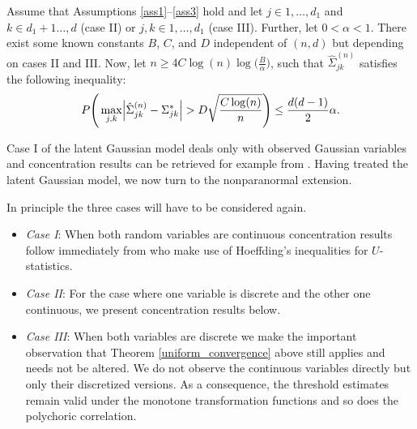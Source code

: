\begin{theorem}\label{uniform_convergence}
    Assume that Assumptions \ref{ass1}--\ref{ass3} hold and let $j \in 1, \dots, d_1$ and $k \in d_1+1 \dots, d$ (case II) or $j,k \in 1, \dots, d_1$ (case III). Further, let $0 < \alpha < 1$. There exist some known constants $B$, $C$, and $D$ independent of $(n,d)$ but depending on cases II and III. Now, let $n \geq 4 C \log(n) \log\Big(\frac{B}{\alpha}\Big)$, such that $\hat{\Sigma}_{jk}^{(n)}$ satisfies the following inequality:
    \begin{equation}
        P\Bigg(\max_{j,k}\abs{\hat{\Sigma}_{jk}^{(n)} - \Sigma_{jk}^{*}} > D\sqrt{\frac{C \log(n)}{n} }\Bigg) \leq \frac{d(d-1)}{2}\alpha.
    \end{equation}
\end{theorem}
\noindent Case I of the latent Gaussian model deals only with observed Gaussian variables and concentration results can be retrieved for example from \citet{Ravikumar11}. Having treated the latent Gaussian model, we now turn to the nonparanormal extension. 


In principle the three cases will have to be considered again. 
\begin{itemize}
    \item \textit{Case I}: When both random variables are continuous concentration results follow immediately from \citet{Liu12} who make use of Hoeffding's inequalities for $U$-statistics.
    \item \textit{Case II}: For the case where one variable is discrete and the other one continuous, we present concentration results below. 
    \item \textit{Case III}: When both variables are discrete we make the important observation that Theorem \ref{uniform_convergence} above still applies and needs not be altered. We do not observe the continuous variables directly but only their discretized versions. As a consequence, the threshold estimates remain valid under the monotone transformation functions and so does the polychoric correlation. 
\end{itemize}

